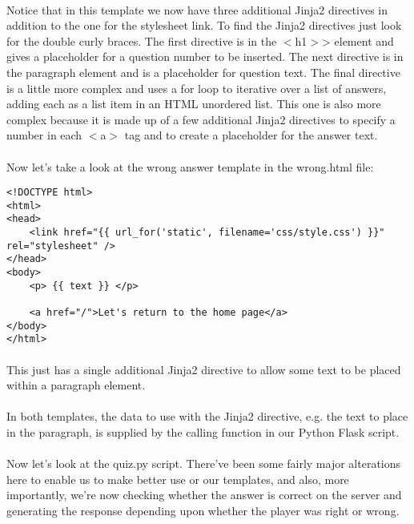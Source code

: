 \paragraph{} Notice that in this template we now have three additional Jinja2 directives in addition to the one for the stylesheet link. To find the Jinja2 directives just look for the double curly braces. The first directive is in the $<$h1$>$> element and gives a placeholder for a question number to be inserted. The next directive is in the paragraph element and is a placeholder for question text. The final directive is a little more complex and uses a for loop to iterative over a list of answers, adding each as a list item in an HTML unordered list. This one is also more complex because it is made up of a few additional Jinja2 directives to specify a number in each $<$a$>$ tag and to create a placeholder for the answer text.

\paragraph{} Now let's take a look at the wrong answer template in the wrong.html file:

\begin{lstlisting}
<!DOCTYPE html>
<html>
<head>
    <link href="{{ url_for('static', filename='css/style.css') }}" rel="stylesheet" />
</head>
<body>
    <p> {{ text }} </p> 

    <a href="/">Let's return to the home page</a>
</body>
</html>

\end{lstlisting}

\paragraph{} This just has a single additional Jinja2 directive to allow some text to be placed within a paragraph element.

\paragraph{} In both templates, the data to use with the Jinja2 directive, e.g. the text to place in the paragraph, is supplied by the calling function in our Python Flask script.

\paragraph{} Now let's look at the quiz.py script. There've been some fairly major alterations here to enable us to make better use or our templates, and also, more importantly, we're now checking whether the answer is correct on the server and generating the response depending upon whether the player was right or wrong.

